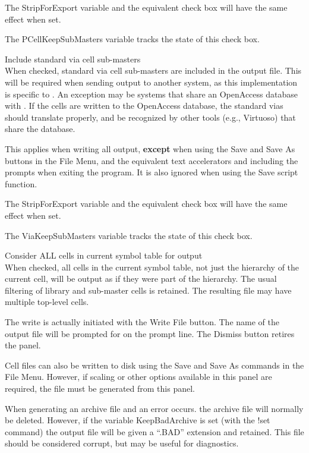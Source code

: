 \begin{description}
The {\et StripForExport} variable and the equivalent check box will
have the same effect when set.

The {\et PCellKeepSubMasters} variable tracks the state of this check
box.

\item{\cb Include standard via cell sub-masters}\\
When checked, standard via cell sub-masters are included in the output
file.  This will be required when sending output to another system, as
this implementation is specific to {\Xic}.
\ifoa
An exception may be systems that share an OpenAccess database with
{\Xic}.  If the cells are written to the OpenAccess database, the
standard vias should translate properly, and be recognized by other
tools (e.g., Virtuoso) that share the database.
\fi

This applies when writing all output, {\bf except} when using the {\cb
Save} and {\cb Save As} buttons in the {\cb File Menu}, and the
equivalent text accelerators and including the prompts when exiting
the program.  It is also ignored when using the {\vt Save} script
function.

The {\et StripForExport} variable and the equivalent check box will
have the same effect when set.

The {\et ViaKeepSubMasters} variable tracks the state of this check
box.

\item{\cb Consider ALL cells in current symbol table for output}\\
When checked, all cells in the current symbol table, not just the
hierarchy of the current cell, will be output as if they were part of
the hierarchy.  The usual filtering of library and sub-master cells is
retained.  The resulting file may have multiple top-level cells.
\end{description}

The write is actually initiated with the {\cb Write File} button.  The
name of the output file will be prompted for on the prompt line.  The
{\cb Dismiss} button retires the panel.

Cell files can also be written to disk using the {\cb Save} and {\cb
Save As} commands in the {\cb File Menu}.  However, if scaling or
other options available in this panel are required, the file must be
generated from this panel.

When generating an archive file and an error occurs.  the archive file
will normally be deleted.  However, if the variable {\et
KeepBadArchive} is set (with the {\cb !set} command) the output file
will be given a ``{\vt .BAD}'' extension and retained.  This file
should be considered corrupt, but may be useful for diagnostics.


